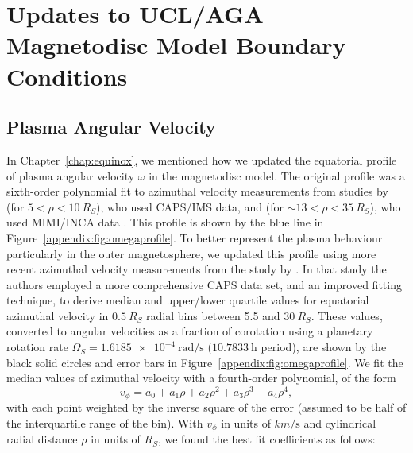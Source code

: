 \appendix
\chapter{Updates to UCL/AGA Magnetodisc Model Boundary Conditions} \label{appendix:sec:wilsonfits}
\section{Plasma Angular Velocity}\label{appendix:sec:plasmaomega}
In Chapter~\ref{chap:equinox}, we mentioned how we updated the equatorial profile of plasma angular velocity $\omega$ in the magnetodisc model. The original profile was a sixth-order polynomial fit to azimuthal velocity measurements from studies by \citet{wilson2008} (for $5<\rho<\SI{10}{R_S}$), who used CAPS/IMS data, and \citet{kane2008} (for ${\sim}13<\rho<\SI{35}{R_S}$), who used MIMI/INCA data \citep[more detail in][]{achilleos2010a}. This profile is shown by the blue line in Figure~\ref{appendix:fig:omegaprofile}. To better represent the plasma behaviour particularly in the outer magnetosphere, we updated this profile using more recent azimuthal velocity measurements from the study by \citet{wilson2017}. In that study the authors employed a more comprehensive CAPS data set, and an improved fitting technique, to derive median and upper/lower quartile values for equatorial azimuthal velocity in $\SI{0.5}{R_S}$ radial bins between 5.5 and $\SI{30}{R_S}$. These values, converted to angular velocities as a fraction of corotation using a planetary rotation rate $\Omega_S = \SI{1.6185e-4}{\radian\per\second}$ ($\SI{10.7833}{\hour}$ period), are shown by the black solid circles and error bars in Figure~\ref{appendix:fig:omegaprofile}. We fit the median values of azimuthal velocity with a fourth-order polynomial, of the form 
\begin{equation} \label{appendix:eq:fourthorderpolyv}
v_\phi =  a_0 + a_1\rho + a_2\rho^2 + a_3\rho^3 + a_4\rho^4,
\end{equation}
with each point weighted by the inverse square of the error (assumed to be half of the interquartile range of the bin). With $v_\phi$ in units of $\si{km\per\second}$ and cylindrical radial distance $\rho$ in units of $\si{R_S}$, we found the best fit coefficients as follows:
